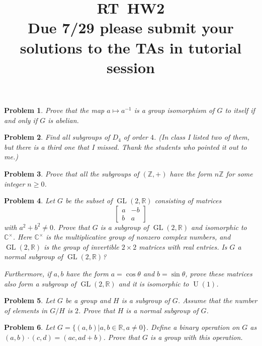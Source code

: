 \documentclass{article}
\title{RT\ HW2 \\ Due 7/29 please submit your solutions to the TAs in tutorial session}
\newtheorem{ex}{Problem}
\newcommand{\C}{\mathbb{C}}
\newcommand{\Z}{\mathbb{Z}}
\newcommand{\R}{\mathbb{R}}
\newcommand{\rr}{\mathbb{R}}
\newcommand{\GL}{\operatorname{GL}}
\newcommand{\U}{\operatorname{U}}
\begin{document}
\maketitle


\begin{ex}
 Prove that the map $a\mapsto a^{-1}$ is a group isomorphism of $G$ to itself if and only if $G$ is abelian. 
\end{ex}

\begin{ex}
 Find all subgroups of $D_4$ of order $4$. (In class I listed two of them, but there is a third one that I missed. Thank the students who pointed it out to me.)
\end{ex}

\begin{ex}
    Prove that all the subgroups of $(\Z,+)$ have the form $n\Z$ for some integer $n\geq 0$.
\end{ex}


\begin{ex}
Let $G$ be the subset of $\GL(2, \rr)$ consisting of matrices 
\[
\begin{bmatrix}
    a     & -b \\
     b   & a 
\end{bmatrix}\]
with $a^2+b^2\neq 0$. Prove that $G$ is a subgroup of $\GL(2, \R)$ and isomorphic to $\C^\times$. Here $\C^\times$ is the multiplicative group of nonzero complex numbers, and $\GL(2, \R)$ is the group of invertible $2\times 2$ matrices with real entries. Is $G$ a normal subgroup of $\GL(2, \R)$?

Furthermore, if $a,b$ have the form $a=\cos \theta$ and $b=\sin \theta$, prove these matrices also form a subgroup of $\GL(2, \R)$ and it is isomorphic to $\U(1)$. 

\end{ex}

\begin{ex}
Let $G$ be a group and $H$ is a subgroup of $G$. Assume that the number of elements in $G/H$ is $2$. Prove that $H$ is a normal subgroup of $G$.
\end{ex}

\begin{ex}
Let $G=\{(a,b)\vert a,b \in \mathbb{R}, a\neq 0\}$. Define a binary operation on $G$ as $(a,b)\cdot (c,d)=(ac,ad+b)$. Prove that $G$ is a group with this operation. 
\end{ex}
\end{document}
